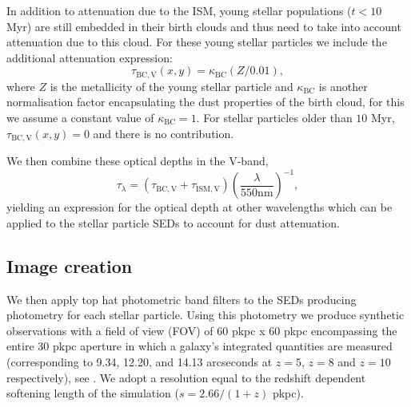 In addition to attenuation due to the ISM, young stellar populations ($t < 10$ Myr) are still embedded in their birth clouds and thus need to take into account attenuation due to this cloud. For these young stellar particles we include the additional attenuation expression:
\begin{equation}
   \tau_{\mathrm{BC,V}}(x, y)=\kappa_{\mathrm{BC}}(Z/0.01) ,
\end{equation}
where $Z$ is the metallicity of the young stellar particle and $\kappa_{\mathrm{BC}}$ is another normalisation factor encapsulating the dust properties of the birth cloud, for this we assume a constant value of $\kappa_{\mathrm{BC}}=1$. For stellar particles older than $10$ Myr, $\tau_{\mathrm{BC,V}}(x, y)=0$ and there is no contribution.

We then combine these optical depths in the V-band,
\begin{equation}
    \tau_\lambda= (\tau_{\mathrm{BC,V}}+\tau_{\mathrm{ISM,V}}) \left(\frac{\lambda}{550 \mathrm{ nm}}\right)^{-1},
\end{equation}
yielding an expression for the optical depth at other wavelengths which can be applied to the stellar particle SEDs to account for dust attenuation.


\subsection{Image creation}
\label{sec:image}

We then apply top hat photometric band filters to the SEDs producing photometry for each stellar particle. Using this photometry we produce synthetic observations with a field of view (FOV) of 60 pkpc x 60 pkpc encompassing the entire 30 pkpc aperture in which a galaxy's integrated quantities are measured (corresponding to 9.34, 12.20, and 14.13 arcseconds at $z=5$, $z=8$ and $z=10$ respectively), see . We adopt a resolution equal to the redshift dependent softening length of the simulation ($s=2.66 / (1 + z)$ pkpc). 

